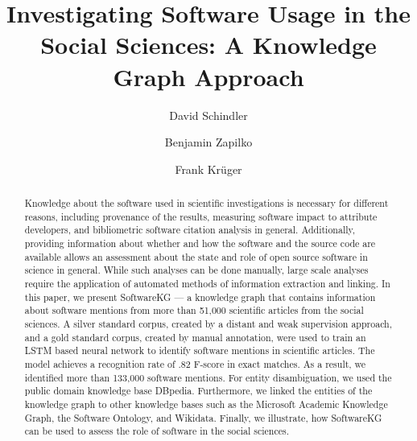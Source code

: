 \documentclass[runningheads]{llncs}
\begin{document}
\title{Investigating Software Usage in the Social Sciences: A Knowledge Graph Approach}



\author{David Schindler \and
Benjamin Zapilko \and
Frank Krüger}

\maketitle             
\begin{abstract}
Knowledge about the software used in scientific investigations is necessary for different reasons, including provenance of the results, measuring software impact to attribute developers, and bibliometric software citation analysis in general.
Additionally, providing information about whether and how the software and the source code are available allows an assessment about the state and role of open source software in science in general.
While such analyses can be done manually, large scale analyses require the application of automated methods of information extraction and linking.
In this paper, we present SoftwareKG --- a knowledge graph that contains information about software mentions from more than 51,000 scientific articles from the social sciences.
A silver standard corpus, created by a distant and weak supervision approach, and a gold standard corpus, created by manual annotation, were used to train an LSTM based neural network to identify software mentions in scientific articles.
The model achieves a recognition rate of .82 F-score in exact matches.
As a result, we identified more than 133,000 software mentions.
For entity disambiguation, we used the public domain knowledge base DBpedia.
Furthermore, we linked the entities of the knowledge graph to other knowledge bases such as the Microsoft Academic Knowledge Graph, the Software Ontology, and Wikidata.
Finally, we illustrate, how SoftwareKG can be used to assess the role of software in the social sciences.







\end{abstract}
\end{document}
